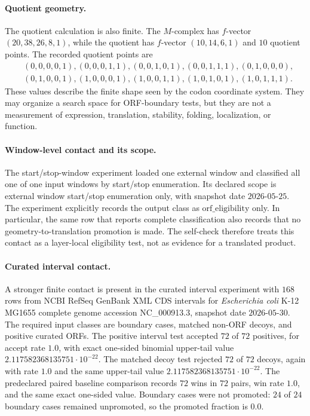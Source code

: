\paragraph{Quotient geometry.}
The quotient calculation is also finite.  The $M$-complex has $f$-vector $(20,38,26,8,1)$, while the quotient has $f$-vector $(10,14,6,1)$ and $10$ quotient points.  The recorded quotient points are
$$
\begin{aligned}
&(0,0,0,0,1),(0,0,0,1,1),(0,0,1,0,1),(0,0,1,1,1),(0,1,0,0,0),\\
&(0,1,0,0,1),(1,0,0,0,1),(1,0,0,1,1),(1,0,1,0,1),(1,0,1,1,1).
\end{aligned}
$$
These values describe the finite shape seen by the codon coordinate system.  They may organize a search space for ORF-boundary tests, but they are not a measurement of expression, translation, stability, folding, localization, or function.

\paragraph{Window-level contact and its scope.}
The start/stop-window experiment loaded one external window and classified all one of one input windows by start/stop enumeration.  Its declared scope is external window start/stop enumeration only, with snapshot date $2026$-$05$-$25$.  The experiment explicitly records the output class as $\mathrm{orf\_eligibility}$ only.  In particular, the same row that reports complete classification also records that no geometry-to-translation promotion is made.  The self-check therefore treats this contact as a layer-local eligibility test, not as evidence for a translated product.

\paragraph{Curated interval contact.}
A stronger finite contact is present in the curated interval experiment with $168$ rows from NCBI RefSeq GenBank XML CDS intervals for \emph{Escherichia coli} K-12 MG1655 complete genome accession NC\_000913.3, snapshot date $2026$-$05$-$30$.  The required input classes are boundary cases, matched non-ORF decoys, and positive curated ORFs.  The positive interval test accepted $72$ of $72$ positives, for accept rate $1.0$, with exact one-sided binomial upper-tail value $2.117582368135751\cdot 10^{-22}$.  The matched decoy test rejected $72$ of $72$ decoys, again with rate $1.0$ and the same upper-tail value $2.117582368135751\cdot 10^{-22}$.  The predeclared paired baseline comparison records $72$ wins in $72$ pairs, win rate $1.0$, and the same exact one-sided value.  Boundary cases were not promoted: $24$ of $24$ boundary cases remained unpromoted, so the promoted fraction is $0.0$.

